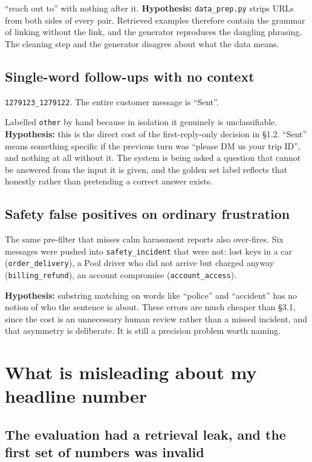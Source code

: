 \documentclass[11pt,a4paper]{article}
\begin{document}
``reach out to'' with nothing after it. \textbf{Hypothesis:} \texttt{data\_prep.py}
strips URLs from both sides of every pair. Retrieved examples therefore contain the
grammar of linking without the link, and the generator reproduces the dangling phrasing.
The cleaning step and the generator disagree about what the data means.

\subsection{Single-word follow-ups with no context}

\texttt{1279123\_1279122}. The entire customer message is ``Sent''.

Labelled \texttt{other} by hand because in isolation it genuinely is unclassifiable.
\textbf{Hypothesis:} this is the direct cost of the first-reply-only decision in
\S1.2. ``Sent'' means something specific if the previous turn was ``please DM us your
trip ID'', and nothing at all without it. The system is being asked a question that
cannot be answered from the input it is given, and the golden set label reflects that
honestly rather than pretending a correct answer exists.

\subsection{Safety false positives on ordinary frustration}

The same pre-filter that misses calm harassment reports also over-fires. Six messages
were pushed into \texttt{safety\_incident} that were not: lost keys in a car
(\texttt{order\_delivery}), a Pool driver who did not arrive but charged anyway
(\texttt{billing\_refund}), an account compromise (\texttt{account\_access}).

\textbf{Hypothesis:} substring matching on words like ``police'' and ``accident'' has no
notion of who the sentence is about. These errors are much cheaper than \S3.1, since the
cost is an unnecessary human review rather than a missed incident, and that asymmetry is
deliberate. It is still a precision problem worth naming.

\section{What is misleading about my headline number}

\subsection{The evaluation had a retrieval leak, and the first set of numbers was invalid}
\end{document}
